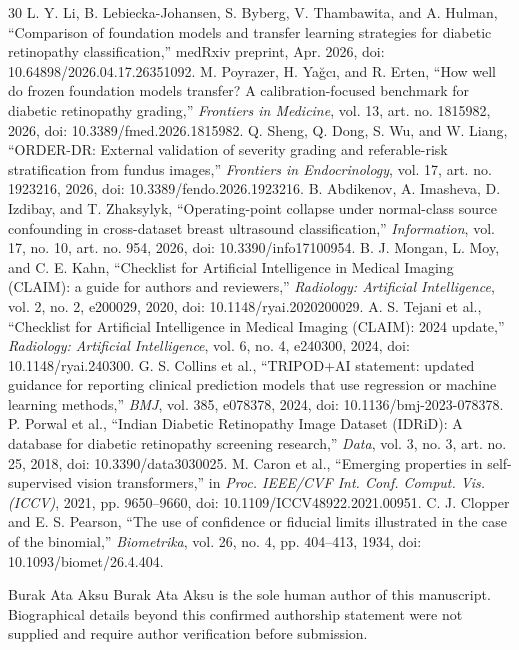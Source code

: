 \documentclass{ieeeaccess}
\begin{document}
\begin{thebibliography}{30}
 L. Y. Li, B. Lebiecka-Johansen, S. Byberg, V. Thambawita, and A. Hulman, ``Comparison of foundation models and transfer learning strategies for diabetic retinopathy classification,'' medRxiv preprint, Apr. 2026, doi: 10.64898/2026.04.17.26351092.
 M. Poyrazer, H. Ya\u{g}c\i, and R. Erten, ``How well do frozen foundation models transfer? A calibration-focused benchmark for diabetic retinopathy grading,'' \emph{Frontiers in Medicine}, vol. 13, art. no. 1815982, 2026, doi: 10.3389/fmed.2026.1815982.
 Q. Sheng, Q. Dong, S. Wu, and W. Liang, ``ORDER-DR: External validation of severity grading and referable-risk stratification from fundus images,'' \emph{Frontiers in Endocrinology}, vol. 17, art. no. 1923216, 2026, doi: 10.3389/fendo.2026.1923216.
 B. Abdikenov, A. Imasheva, D. Izdibay, and T. Zhaksylyk, ``Operating-point collapse under normal-class source confounding in cross-dataset breast ultrasound classification,'' \emph{Information}, vol. 17, no. 10, art. no. 954, 2026, doi: 10.3390/info17100954.
 B. J. Mongan, L. Moy, and C. E. Kahn, ``Checklist for Artificial Intelligence in Medical Imaging (CLAIM): a guide for authors and reviewers,'' \emph{Radiology: Artificial Intelligence}, vol. 2, no. 2, e200029, 2020, doi: 10.1148/ryai.2020200029.
 A. S. Tejani et al., ``Checklist for Artificial Intelligence in Medical Imaging (CLAIM): 2024 update,'' \emph{Radiology: Artificial Intelligence}, vol. 6, no. 4, e240300, 2024, doi: 10.1148/ryai.240300.
 G. S. Collins et al., ``TRIPOD+AI statement: updated guidance for reporting clinical prediction models that use regression or machine learning methods,'' \emph{BMJ}, vol. 385, e078378, 2024, doi: 10.1136/bmj-2023-078378.
 P. Porwal et al., ``Indian Diabetic Retinopathy Image Dataset (IDRiD): A database for diabetic retinopathy screening research,'' \emph{Data}, vol. 3, no. 3, art. no. 25, 2018, doi: 10.3390/data3030025.
 M. Caron et al., ``Emerging properties in self-supervised vision transformers,'' in \emph{Proc. IEEE/CVF Int. Conf. Comput. Vis. (ICCV)}, 2021, pp. 9650--9660, doi: 10.1109/ICCV48922.2021.00951.
 C. J. Clopper and E. S. Pearson, ``The use of confidence or fiducial limits illustrated in the case of the binomial,'' \emph{Biometrika}, vol. 26, no. 4, pp. 404--413, 1934, doi: 10.1093/biomet/26.4.404.
\end{thebibliography}

\begin{IEEEbiographynophoto}{Burak Ata Aksu}
Burak Ata Aksu is the sole human author of this manuscript. Biographical details beyond this confirmed authorship statement were not supplied and require author verification before submission.
\end{IEEEbiographynophoto}
\EOD
\end{document}
